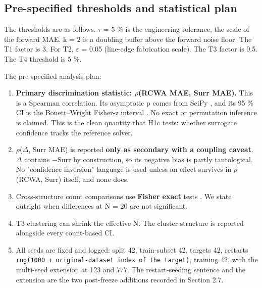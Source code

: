\documentclass[11pt,a4paper]{article}
\newcounter{none}   %
\providecommand{\tightlist}{\setlength{\itemsep}{0pt}\setlength{\parskip}{0pt}}
\begin{document}
\subsection{Pre-specified thresholds and statistical plan}\label{sec:2.5}

The thresholds are as follows. \ensuremath{\tau} = 5 \% is the engineering tolerance, the scale of the
forward MAE. k = 2 is a doubling buffer above the forward noise floor. The T1 factor is 3.
For T2, \ensuremath{\varepsilon} = 0.05 (line-edge fabrication scale). The T3 factor is 0.5. The T4 threshold is
5 \%.

The pre-specified analysis plan:

\begin{enumerate}
\def\labelenumi{\arabic{enumi}.}
\tightlist
\item
  \textbf{Primary discrimination statistic: \ensuremath{\rho}(RCWA MAE, Surr MAE).} This is a Spearman
  correlation. Its asymptotic p comes from SciPy \cite{al202043}, and its 95 \% CI is the
  Bonett--Wright Fisher-z interval \cite{bonett200044}. No exact or permutation inference is claimed.
  This is the clean quantity that H1c tests: whether surrogate confidence tracks the
  reference solver.
\item
  \ensuremath{\rho}(\ensuremath{\Delta}, Surr MAE) is reported \textbf{only as secondary with a coupling caveat}. \ensuremath{\Delta} contains
  \ensuremath{-}Surr by construction, so its negative bias is partly tautological. No "confidence
  inversion" language is used unless an effect survives in \ensuremath{\rho}(RCWA, Surr) itself, and none
  does.
\item
  Cross-structure count comparisons use \textbf{Fisher exact} tests \cite{fisher193545}. We state outright
  when differences at N = 20 are not significant.
\item
  T3 clustering can shrink the effective N. The cluster structure is reported alongside
  every count-based CI.
\item
  All seeds are fixed and logged: split 42, train-subset 42, targets 42, restarts
  \texttt{rng(1000\ +\ original-dataset\ index\ of\ the\ target)}, training 42, with the multi-seed
  extension at 123 and 777. The restart-seeding sentence and the extension are the two
  post-freeze additions recorded in Section 2.7.
\end{enumerate}
\end{document}
